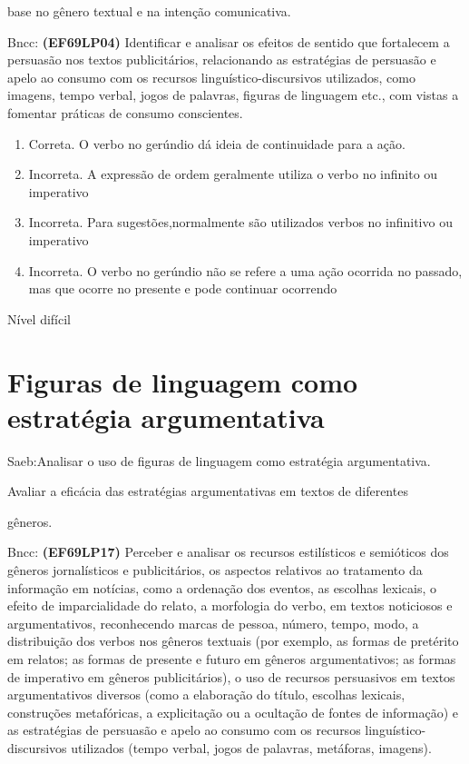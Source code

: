{base no gênero textual e na intenção comunicativa.

Bncc: \textbf{(EF69LP04)} Identificar e analisar os efeitos de sentido
que fortalecem a persuasão nos textos publicitários, relacionando as
estratégias de persuasão e apelo ao consumo com os recursos
linguístico-discursivos utilizados, como imagens, tempo verbal, jogos de
palavras, figuras de linguagem etc., com vistas a fomentar práticas de
consumo conscientes.

\begin{enumerate}
\def\labelenumi{\arabic{enumi}.}
\item
  Correta. O verbo no gerúndio dá ideia de continuidade para a ação.
\item
  Incorreta. A expressão de ordem geralmente utiliza o verbo no infinito
  ou imperativo
\item
  Incorreta. Para sugestões,normalmente são utilizados verbos no
  infinitivo ou imperativo
\item
  Incorreta. O verbo no gerúndio não se refere a uma ação ocorrida no
  passado, mas que ocorre no presente e pode continuar ocorrendo
\end{enumerate}

Nível difícil

\pagestyle{port}
\chapter{Figuras de linguagem como estratégia argumentativa}

Saeb:Analisar o uso de figuras de linguagem como estratégia
argumentativa.

Avaliar a eficácia das estratégias argumentativas em textos de
diferentes

gêneros.

Bncc: \textbf{(EF69LP17)} Perceber e analisar os recursos estilísticos e
semióticos dos gêneros jornalísticos e publicitários, os aspectos
relativos ao tratamento da informação em notícias, como a ordenação dos
eventos, as escolhas lexicais, o efeito de imparcialidade do relato, a
morfologia do verbo, em textos noticiosos e argumentativos, reconhecendo
marcas de pessoa, número, tempo, modo, a distribuição dos verbos nos
gêneros textuais (por exemplo, as formas de pretérito em relatos; as
formas de presente e futuro em gêneros argumentativos; as formas de
imperativo em gêneros publicitários), o uso de recursos persuasivos em
textos argumentativos diversos (como a elaboração do título, escolhas
lexicais, construções metafóricas, a explicitação ou a ocultação de
fontes de informação) e as estratégias de persuasão e apelo ao consumo
com os recursos linguístico-discursivos utilizados (tempo verbal, jogos
de palavras, metáforas, imagens).

}
